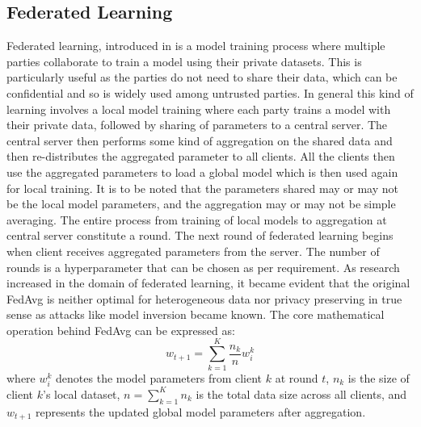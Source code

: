 \documentclass[lettersize,journal]{IEEEtran}
\begin{document}
\subsection{Federated Learning}
Federated learning, introduced in \cite{mcmahan2017communication} is a model training process where multiple parties collaborate to train a model using their private datasets. This is particularly useful as the parties do not need to share their data, which can be confidential and so is widely used among untrusted parties. In general this kind of learning involves a local model training where each party trains a model with their private data, followed by sharing of parameters to a central server. The central server then performs some kind of aggregation on the shared data and then re-distributes the aggregated parameter to all clients. All the clients then use the aggregated parameters to load a global model which is then used again for local training. It is to be noted that the parameters shared may or may not be the local model parameters, and the aggregation may or may not be simple averaging. The entire process from training of local models to aggregation at central server constitute a round. The next round of federated learning begins when client receives aggregated parameters from the server. The number of rounds is a hyperparameter that can be chosen as per requirement. As research increased in the domain of federated learning, it became evident that the original FedAvg is neither optimal for heterogeneous data nor privacy preserving in true sense as attacks like model inversion became known. The core mathematical operation behind FedAvg can be expressed as:
$$w_{t+1} = \sum_{k=1}^{K}\frac{n_k}{n}w_i^k$$
where $w_i^k$ denotes the model parameters from client $k$ at round $t$, $n_k$ is the size of client $k$'s local dataset, $n = \sum_{k=1}^{K}n_k$ is the total data size across all clients, and $w_{t+1}$ represents the updated global model parameters after aggregation.
\end{document}
